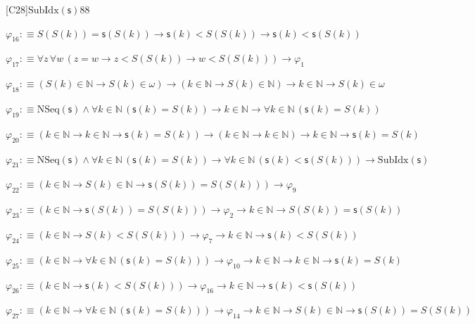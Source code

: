 \begin{fullproof}{[C28]}{$\mathrm{SubIdx}(\mathsf{s})$}{88}
\begin{abbrevlist}
\item $\varphi_{16} :\equiv S(S(k)) = \mathsf{s}(S(k)) \to \mathsf{s}(k) < S(S(k)) \to \mathsf{s}(k) < \mathsf{s}(S(k))$
\item $\varphi_{17} :\equiv \forall z\,\forall w\,(z = w \to z < S(S(k)) \to w < S(S(k))) \to \varphi_{1}$
\item $\varphi_{18} :\equiv (S(k) \in \mathbb{N} \to S(k) \in \omega) \to (k \in \mathbb{N} \to S(k) \in \mathbb{N}) \to k \in \mathbb{N} \to S(k) \in \omega$
\item $\varphi_{19} :\equiv \mathrm{NSeq}(\mathsf{s}) \land \forall k \in \mathbb{N}\,(\mathsf{s}(k) = S(k)) \to k \in \mathbb{N} \to \forall k \in \mathbb{N}\,(\mathsf{s}(k) = S(k))$
\item $\varphi_{20} :\equiv (k \in \mathbb{N} \to k \in \mathbb{N} \to \mathsf{s}(k) = S(k)) \to (k \in \mathbb{N} \to k \in \mathbb{N}) \to k \in \mathbb{N} \to \mathsf{s}(k) = S(k)$
\item $\varphi_{21} :\equiv \mathrm{NSeq}(\mathsf{s}) \land \forall k \in \mathbb{N}\,(\mathsf{s}(k) = S(k)) \to \forall k \in \mathbb{N}\,(\mathsf{s}(k) < \mathsf{s}(S(k))) \to \mathrm{SubIdx}(\mathsf{s})$
\item $\varphi_{22} :\equiv (k \in \mathbb{N} \to S(k) \in \mathbb{N} \to \mathsf{s}(S(k)) = S(S(k))) \to \varphi_{9}$
\item $\varphi_{23} :\equiv (k \in \mathbb{N} \to \mathsf{s}(S(k)) = S(S(k))) \to \varphi_{2} \to k \in \mathbb{N} \to S(S(k)) = \mathsf{s}(S(k))$
\item $\varphi_{24} :\equiv (k \in \mathbb{N} \to S(k) < S(S(k))) \to \varphi_{7} \to k \in \mathbb{N} \to \mathsf{s}(k) < S(S(k))$
\item $\varphi_{25} :\equiv (k \in \mathbb{N} \to \forall k \in \mathbb{N}\,(\mathsf{s}(k) = S(k))) \to \varphi_{10} \to k \in \mathbb{N} \to k \in \mathbb{N} \to \mathsf{s}(k) = S(k)$
\item $\varphi_{26} :\equiv (k \in \mathbb{N} \to \mathsf{s}(k) < S(S(k))) \to \varphi_{16} \to k \in \mathbb{N} \to \mathsf{s}(k) < \mathsf{s}(S(k))$
\item $\varphi_{27} :\equiv (k \in \mathbb{N} \to \forall k \in \mathbb{N}\,(\mathsf{s}(k) = S(k))) \to \varphi_{14} \to k \in \mathbb{N} \to S(k) \in \mathbb{N} \to \mathsf{s}(S(k)) = S(S(k))$
\end{abbrevlist}
\end{fullproof}
